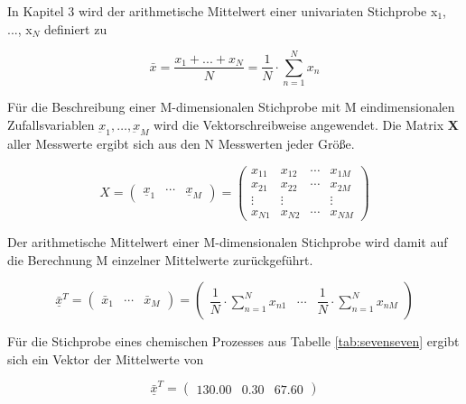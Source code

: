 \noindent In Kapitel 3 wird der arithmetische Mittelwert einer univariaten Stichprobe x$_{1}$, ..., x$_{N}$ definiert zu

\begin{equation}\label{eq:seveneleven}
\bar{x}=\dfrac{x_{1} + ... +x_{N} }{N} =\dfrac{1}{N} \cdot \sum _{n=1}^{N}x_{n}
\end{equation}

\noindent F\"{u}r die Beschreibung einer M-dimensionalen Stichprobe mit M eindimensionalen Zufallsvariablen $\underbar{x}_{1}, \dots, \underbar{x}_{M}$ wird die Vektorschreibweise angewendet. Die Matrix \textbf{X} aller Messwerte ergibt sich aus den N Messwerten jeder Gr\"{o}{\ss}e.

\begin{equation}\label{eq:seventwelve}
X=\left(\begin{array}{ccc} {\underline{x}_{1} } & {\cdots } & {\underline{x}_{M} } \end{array}\right)=\left(\begin{array}{cccc} {x_{11} } & {x_{12} } & {\cdots } & {x_{1M}} \\ 
{x_{21} } & {x_{22} } & {\cdots } & {x_{2M}} \\ 
{\vdots } & {\vdots } & {} & {\vdots } \\ 
{x_{N1} } & {x_{N2} } & {\cdots } & {x_{NM}} \end{array}\right)
\end{equation}

\noindent Der arithmetische Mittelwert einer M-dimensionalen Stichprobe wird damit auf die Berechnung M einzelner Mittelwerte zur\"{u}ckgef\"{u}hrt.

\begin{equation}\label{eq:seventhirteen}
\underline{\bar{x}}^{T} =\left(\begin{array}{ccc} {\bar{x}_{1}} & {\cdots} & {\bar{x}_{M}} \end{array}\right)=\left(\begin{array}{ccc} {\dfrac{1}{N} \cdot \sum _{n=1}^{N}x_{n1}} & {\cdots} & {\dfrac{1}{N} \cdot \sum _{n=1}^{N}x_{nM}} \end{array}\right)
\end{equation}

\noindent F\"{u}r die Stichprobe eines chemischen Prozesses aus Tabelle \ref{tab:sevenseven} ergibt sich ein Vektor der Mittelwerte von

\begin{equation}\label{eq:sevenfourteen}
\bar{\underline{x}}^{T} =\left(\begin{array}{ccc} {130.00} & {0.30} & {67.60} \end{array}\right)
\end{equation}

